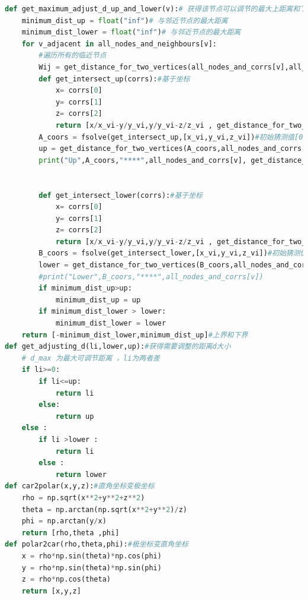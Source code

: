 \documentclass[withoutpreface,bwprint]{cumcmthesis} %
\begin{document}
\begin{appendices}
\begin{lstlisting}[language=python]
def get_maximum_adjust_d_up_and_lower(v):# 获得该节点可以调节的最大上距离和下距离
    minimum_dist_up = float("inf")# 与邻近节点的最大距离
    minimum_dist_lower = float("inf")# 与邻近节点的最大距离
    for v_adjacent in all_nodes_and_neighbours[v]:
        #遍历所有的临近节点
        Wij = get_distance_for_two_vertices(all_nodes_and_corrs[v],all_nodes_and_corrs[v_adjacent])
        def get_intersect_up(corrs):#基于坐标
            x= corrs[0]
            y= corrs[1]
            z= corrs[2]
            return [x/x_vi-y/y_vi,y/y_vi-z/z_vi , get_distance_for_two_vertices([x,y,z],all_nodes_and_corrs[v_adjacent])-Wij*(1-0.0007)]
        A_coors = fsolve(get_intersect_up,[x_vi,y_vi,z_vi])#初始猜测值[0,-1]
        up = get_distance_for_two_vertices(A_coors,all_nodes_and_corrs[v])
        print("Up",A_coors,"****",all_nodes_and_corrs[v], get_distance_for_two_vertices(A_coors,all_nodes_and_corrs[v_adjacent])-Wij*(1-0.0007))
        
        
        def get_intersect_lower(corrs):#基于坐标
            x= corrs[0]
            y= corrs[1]
            z= corrs[2]
            return [x/x_vi-y/y_vi,y/y_vi-z/z_vi , get_distance_for_two_vertices([x,y,z],all_nodes_and_corrs[v_adjacent])-Wij*(1+0.0007)]
        B_coors = fsolve(get_intersect_lower,[x_vi,y_vi,z_vi])#初始猜测值[0,-1]
        lower = get_distance_for_two_vertices(B_coors,all_nodes_and_corrs[v])
        #print("Lower",B_coors,"****",all_nodes_and_corrs[v])
        if minimum_dist_up>up:
            minimum_dist_up = up
        if minimum_dist_lower > lower:
            minimum_dist_lower = lower 
    return [-minimum_dist_lower,minimum_dist_up]#上界和下界
def get_adjusting_d(li,lower,up):#获得需要调整的距离d大小
    # d_max 为最大可调节距离 ，li为两者差
    if li>=0:
        if li<=up:
            return li
        else:
            return up
    else :
        if li >lower :
            return li
        else :
            return lower 
def car2polar(x,y,z):#直角坐标变极坐标
    rho = np.sqrt(x**2+y**2+z**2)
    theta = np.arctan(np.sqrt(x**2+y**2)/z)
    phi = np.arctan(y/x)
    return [rho,theta ,phi]
def polar2car(rho,theta,phi):#极坐标变直角坐标
    x = rho*np.sin(theta)*np.cos(phi)
    y = rho*np.sin(theta)*np.sin(phi)
    z = rho*np.cos(theta)
    return [x,y,z]


\end{lstlisting}
\end{appendices}
\end{document}
